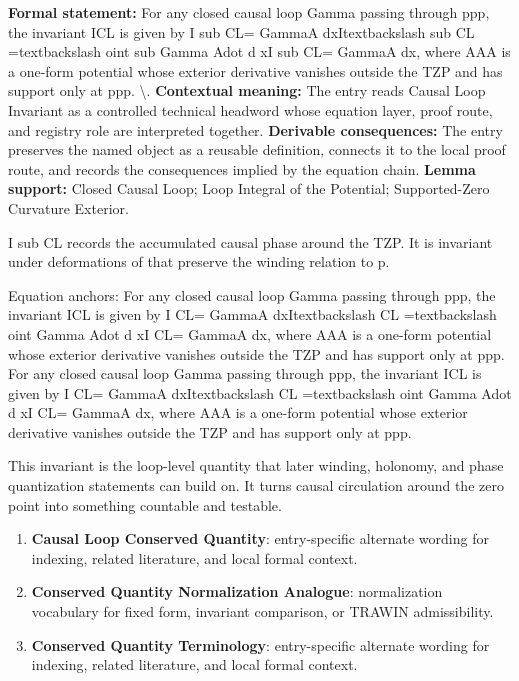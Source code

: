 \begingroup\footnotesize\setlength{\emergencystretch}{3em}\sloppy
\textbf{Formal statement:} For any closed causal loop Gamma passing through ppp, the invariant ICL is given by I sub CL= GammaA dxItextbackslash sub CL =textbackslash oint sub Gamma Adot d xI sub CL= GammaA dx, where AAA is a one-form potential whose exterior derivative vanishes outside the TZP and has support only at ppp. \textbackslash{}. \textbf{Contextual meaning:} The entry reads Causal Loop Invariant as a controlled technical headword whose equation layer, proof route, and registry role are interpreted together. \textbf{Derivable consequences:} The entry preserves the named object as a reusable definition, connects it to the local proof route, and records the consequences implied by the equation chain. \textbf{Lemma support:} Closed Causal Loop; Loop Integral of the Potential; Supported-Zero Curvature Exterior.\par
\endgroup

I sub CL records the accumulated causal phase around the TZP. It is invariant under deformations of that preserve the winding relation to p.

Equation anchors: For any closed causal loop Gamma passing through ppp, the invariant ICL is given by I CL= GammaA dxItextbackslash CL =textbackslash oint Gamma Adot d xI CL= GammaA dx, where AAA is a one-form potential whose exterior derivative vanishes outside the TZP and has support only at ppp. For any closed causal loop Gamma passing through ppp, the invariant ICL is given by I CL= GammaA dxItextbackslash CL =textbackslash oint Gamma Adot d xI CL= GammaA dx, where AAA is a one-form potential whose exterior derivative vanishes outside the TZP and has support only at ppp.

This invariant is the loop-level quantity that later winding, holonomy, and phase quantization statements can build on. It turns causal circulation around the zero point into something countable and testable.
\endgroup

\begingroup\footnotesize\sloppy
\begin{enumerate}[leftmargin=1.35em,itemsep=1pt,topsep=1pt,parsep=0pt]
\item \textbf{Causal Loop Conserved Quantity}: entry-specific alternate wording for indexing, related literature, and local formal context.
\item \textbf{Conserved Quantity Normalization Analogue}: normalization vocabulary for fixed form, invariant comparison, or TRAWIN admissibility.
\item \textbf{Conserved Quantity Terminology}: entry-specific alternate wording for indexing, related literature, and local formal context.
\end{enumerate}
\endgroup

